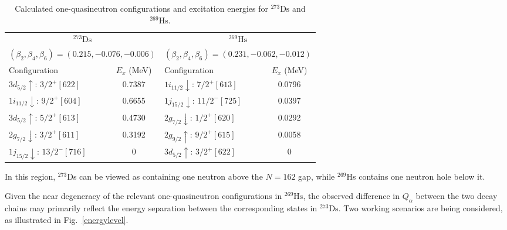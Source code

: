\documentclass[11pt]{article}
\begin{document}
\begin{table}[htbp]
    \centering
    \caption{Calculated one-quasineutron configurations and excitation energies for $^{273}\mathrm{Ds}$ and $^{269}\mathrm{Hs}$.}
    \label{tab:configurations_Ds_Hs}
    \begin{tabular}{l c l c}
        \toprule
        \multicolumn{2}{c}{$^{273}\mathrm{Ds}$} &
        \multicolumn{2}{c}{$^{269}\mathrm{Hs}$} \\
        \multicolumn{2}{c}{$(\beta_2,\beta_4,\beta_6)
        =(0.215,-0.076,-0.006)$} &
        \multicolumn{2}{c}{$(\beta_2,\beta_4,\beta_6)
        =(0.231,-0.062,-0.012)$} \\
        \cmidrule(lr){1-2}
        \cmidrule(lr){3-4}
        Configuration & $E_x$ (MeV) &
        Configuration & $E_x$ (MeV) \\
        \midrule
        $3d_{5/2}\uparrow:\,3/2^{+}[622]$
            & 0.7387
            & $1i_{11/2}\downarrow:\,7/2^{+}[613]$
            & 0.0796 \\
        $1i_{11/2}\downarrow:\,9/2^{+}[604]$
            & 0.6655
            & $1j_{15/2}\downarrow:\,11/2^{-}[725]$
            & 0.0397 \\
        $3d_{5/2}\uparrow:\,5/2^{+}[613]$
            & 0.4730
            & $2g_{7/2}\downarrow:\,1/2^{+}[620]$
            & 0.0292 \\
        $2g_{7/2}\downarrow:\,3/2^{+}[611]$
            & 0.3192
            & $2g_{9/2}\uparrow:\,9/2^{+}[615]$
            & 0.0058 \\
        $1j_{15/2}\downarrow:\,13/2^{-}[716]$
            & 0
            & $3d_{5/2}\uparrow:\,3/2^{+}[622]$
            & 0 \\
        \bottomrule
    \end{tabular}
\end{table}

In this region, $^{273}$Ds can be viewed as containing one neutron above the $N=162$ gap, while $^{269}$Hs contains one neutron hole below it. 

Given the near degeneracy of the relevant one-quasineutron configurations in $^{269}\mathrm{Hs}$, the observed difference in $Q_{\alpha}$ between the two decay chains may primarily reflect the energy separation between the corresponding states in $^{273}\mathrm{Ds}$. 
Two working scenarios are being considered, as illustrated in Fig.~\ref{energylevel}.
\end{document}
